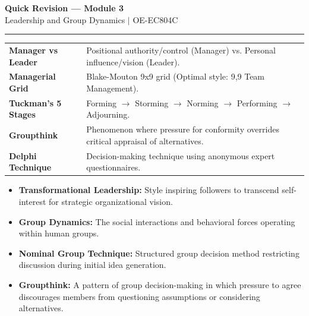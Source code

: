 \documentclass[11pt,a4paper]{article}
\begin{document}
\newpage
\begin{center}
  {\large\bfseries\color{myred} Quick Revision --- Module 3}\\[3pt]
  {\small\color{mydark} Leadership and Group Dynamics $|$ OE-EC804C}
\end{center}
\vspace{-4pt}
\hrule
\vspace{8pt}

\begin{tcolorbox}[formulabox, title={\textbf{Key Concepts and Metrics at a Glance}}]
\renewcommand{\arraystretch}{1.35}
\begin{tabularx}{\linewidth}{>{\raggedright\arraybackslash\bfseries}p{4.5cm} X}
Manager vs Leader & Positional authority/control (Manager) vs. Personal influence/vision (Leader). \\[4pt]
Managerial Grid & Blake-Mouton 9x9 grid (Optimal style: 9,9 Team Management). \\[4pt]
Tuckman's 5 Stages & Forming $\to$ Storming $\to$ Norming $\to$ Performing $\to$ Adjourning. \\[4pt]
Groupthink & Phenomenon where pressure for conformity overrides critical appraisal of alternatives. \\[4pt]
Delphi Technique & Decision-making technique using anonymous expert questionnaires. \\
\end{tabularx}
\end{tcolorbox}

\begin{tcolorbox}[defbox, title={\textbf{One-Line Definitions for Exam Revision}}]
  \begin{itemize}[leftmargin=*, itemsep=2pt]
    \item \textbf{Transformational Leadership:} Style inspiring followers to transcend self-interest for strategic organizational vision.
    \item \textbf{Group Dynamics:} The social interactions and behavioral forces operating within human groups.
    \item \textbf{Nominal Group Technique:} Structured group decision method restricting discussion during initial idea generation.
    \item \textbf{Groupthink:} A pattern of group decision-making in which pressure to agree discourages members from questioning assumptions or considering alternatives.
  \end{itemize}
\end{tcolorbox}
\end{document}
